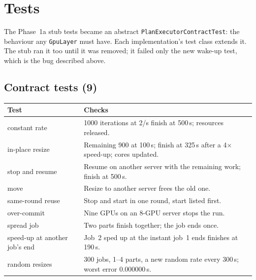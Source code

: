 \documentclass[11pt,a4paper]{article}
\newcommand{\code}[1]{\texttt{#1}}
\begin{document}
\section{Tests}

The Phase~1a stub tests became an abstract \code{PlanExecutorContractTest}: the behaviour any
\code{GpuLayer} must have. Each implementation's test class extends it. The stub ran it too until
it was removed; it failed only the new wake-up test, which is the bug described above.

\subsection{Contract tests (9)}
\begin{center}
\begin{tabularx}{\linewidth}{@{}lX@{}}
\toprule
Test & Checks \\
\midrule
constant rate & 1000 iterations at 2/s finish at 500\,s; resources released. \\
in-place resize & Remaining 900 at 100\,s; finish at 325\,s after a 4$\times$ speed-up; cores updated. \\
stop and resume & Resume on another server with the remaining work; finish at 500\,s. \\
move & Resize to another server frees the old one. \\
same-round reuse & Stop and start in one round, start listed first. \\
over-commit & Nine GPUs on an 8-GPU server stops the run. \\
spread job & Two parts finish together; the job ends once. \\
speed-up at another job's end & Job~2 sped up at the instant job~1 ends finishes at 190\,s. \\
random resizes & 300 jobs, 1--4 parts, a new random rate every 300\,s; worst error 0.000000\,s. \\
\bottomrule
\end{tabularx}
\end{center}
\end{document}
